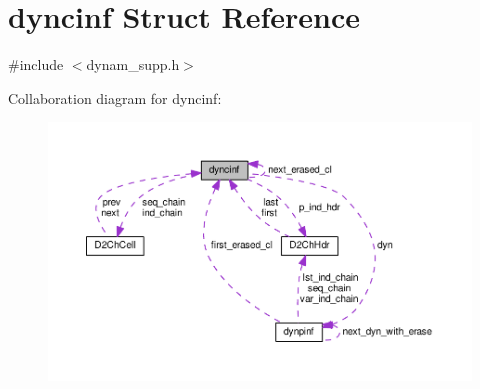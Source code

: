 \hypertarget{structdyncinf}{}\section{dyncinf Struct Reference}
\label{structdyncinf}


{\ttfamily \#include $<$dynam\+\_\+supp.\+h$>$}



Collaboration diagram for dyncinf\+:\nopagebreak
\begin{figure}[H]
\begin{center}
\leavevmode
\includegraphics[width=350pt]{structdyncinf__coll__graph}
\end{center}
\end{figure}
